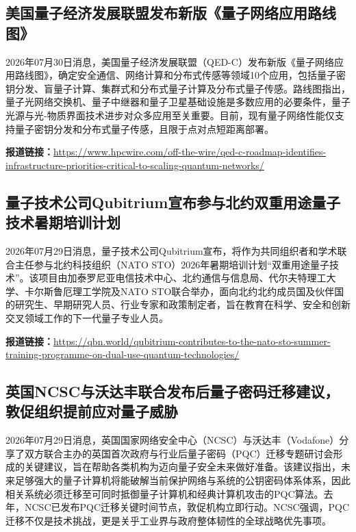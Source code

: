 \documentclass[12pt,a4paper]{ctexart}
\begin{document}
\subsection{ 美国量子经济发展联盟发布新版《量子网络应用路线图》 }

2026年07月30日消息，美国量子经济发展联盟（QED-C）发布新版《量子网络应用路线图》，确定安全通信、网络计算和分布式传感等领域10个应用，包括量子密钥分发、盲量子计算、集群式和分布式量子计算及分布式量子传感。路线图指出，量子光网络交换机、量子中继器和量子卫星基础设施是多数应用的必要条件，量子光源与光-物质界面技术进步对众多应用至关重要。目前，现有量子网络性能仅支持量子密钥分发和分布式量子传感，且限于点对点短距离部署。

\noindent\textbf{报道链接：}\url{https://www.hpcwire.com/off-the-wire/qed-c-roadmap-identifies-infrastructure-priorities-critical-to-scaling-quantum-networks/}

\subsection{ 量子技术公司Qubitrium宣布参与北约双重用途量子技术暑期培训计划 }

2026年07月29日消息，量子技术公司Qubitrium宣布，将作为共同组织者和学术联合主任参与北约科技组织（NATO STO）2026年暑期培训计划“双重用途量子技术”。该项目由加泰罗尼亚电信技术中心、北约通信与信息局、代尔夫特理工大学、卡尔斯鲁厄理工学院及NATO STO联合举办，面向北约北约成员国及伙伴国的研究生、早期研究人员、行业专家和政策制定者，旨在教育在科学、安全和创新交叉领域工作的下一代量子专业人员。

\noindent\textbf{报道链接：}\url{https://qbn.world/qubitrium-contributes-to-the-nato-sto-summer-training-programme-on-dual-use-quantum-technologies/}

\subsection{ 英国NCSC与沃达丰联合发布后量子密码迁移建议，敦促组织提前应对量子威胁 }

2026年07月29日消息，英国国家网络安全中心（NCSC）与沃达丰（Vodafone）分享了双方联合主办的英国首次政府与行业后量子密码（PQC）迁移专题研讨会形成的关键建议，旨在帮助各类机构为迈向量子安全未来做好准备。该建议指出，未来足够强大的量子计算机将能破解当前保护网络与系统的公钥密码体系体系，因此相关系统必须迁移至可同时抵御量子计算机和经典计算机攻击的PQC算法。去年，NCSC已发布PQC迁移关键时间节点，敦促机构立即行动。NCSC强调，PQC迁移不仅是技术挑战，更是关乎工业界与政府整体韧性的全球战略优先事项。
\end{document}
